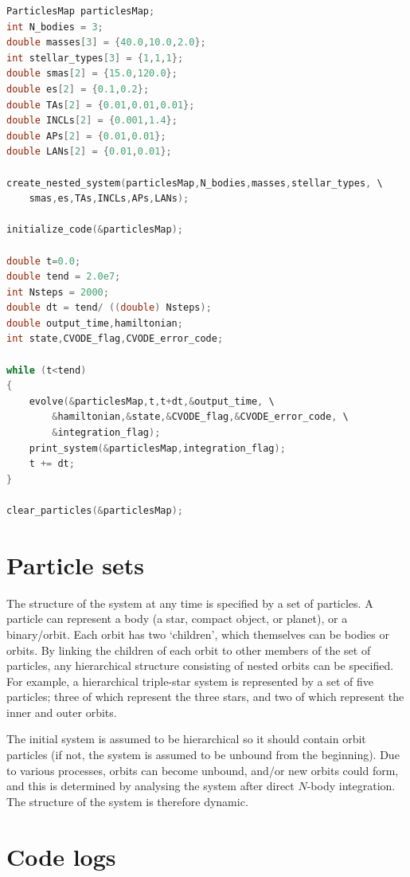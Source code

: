 \documentclass[a4paper,11pt]{article}
\begin{document}
\begin{lstlisting}[caption={Example usage within \textsc{C++} for a triple.},label={code:cpp},language=C++]
ParticlesMap particlesMap;
int N_bodies = 3;
double masses[3] = {40.0,10.0,2.0};
int stellar_types[3] = {1,1,1};
double smas[2] = {15.0,120.0};
double es[2] = {0.1,0.2};
double TAs[2] = {0.01,0.01,0.01};
double INCLs[2] = {0.001,1.4};
double APs[2] = {0.01,0.01};
double LANs[2] = {0.01,0.01};

create_nested_system(particlesMap,N_bodies,masses,stellar_types, \
    smas,es,TAs,INCLs,APs,LANs);

initialize_code(&particlesMap);

double t=0.0;
double tend = 2.0e7;
int Nsteps = 2000;
double dt = tend/ ((double) Nsteps);
double output_time,hamiltonian;
int state,CVODE_flag,CVODE_error_code;

while (t<tend)
{
    evolve(&particlesMap,t,t+dt,&output_time, \
        &hamiltonian,&state,&CVODE_flag,&CVODE_error_code, \
        &integration_flag);
    print_system(&particlesMap,integration_flag);
    t += dt;
}

clear_particles(&particlesMap);
\end{lstlisting}


\section{Particle sets}
\label{sect:particle}
The structure of the system at any time is specified by a set of particles. A particle can represent a body (a star, compact object, or planet), or a binary/orbit. Each orbit has two `children', which themselves can be bodies or orbits. By linking the children of each orbit to other members of the set of particles, any hierarchical structure consisting of nested orbits can be specified. For example, a hierarchical triple-star system is represented by a set of five particles; three of which represent the three stars, and two of which represent the inner and outer orbits. 

The initial system is assumed to be hierarchical so it should contain orbit particles (if not, the system is assumed to be unbound from the beginning). Due to various processes, orbits can become unbound, and/or new orbits could form, and this is determined by analysing the system after direct $N$-body integration. The structure of the system is therefore dynamic. 


\section{Code logs}
\label{sect:log}
\end{document}

